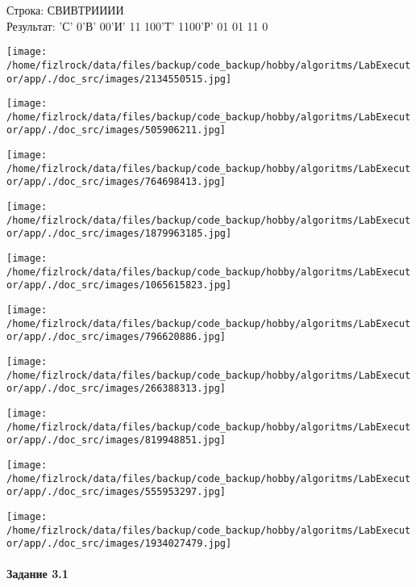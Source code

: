 \documentclass[a4paper, 12pt]{article}
\begin{document}
Строка: 
СВИВТРИИИИ\\
Результат: 'С' 0'В' 00'И' 11 100'Т' 1100'Р' 01 01 11 0

\texttt{[image: /home/fizlrock/data/files/backup/code\_backup/hobby/algoritms/LabExecutor/app/./doc\_src/images/2134550515.jpg]}

\texttt{[image: /home/fizlrock/data/files/backup/code\_backup/hobby/algoritms/LabExecutor/app/./doc\_src/images/505906211.jpg]}

\texttt{[image: /home/fizlrock/data/files/backup/code\_backup/hobby/algoritms/LabExecutor/app/./doc\_src/images/764698413.jpg]}

\texttt{[image: /home/fizlrock/data/files/backup/code\_backup/hobby/algoritms/LabExecutor/app/./doc\_src/images/1879963185.jpg]}

\texttt{[image: /home/fizlrock/data/files/backup/code\_backup/hobby/algoritms/LabExecutor/app/./doc\_src/images/1065615823.jpg]}

\texttt{[image: /home/fizlrock/data/files/backup/code\_backup/hobby/algoritms/LabExecutor/app/./doc\_src/images/796620886.jpg]}

\texttt{[image: /home/fizlrock/data/files/backup/code\_backup/hobby/algoritms/LabExecutor/app/./doc\_src/images/266388313.jpg]}

\texttt{[image: /home/fizlrock/data/files/backup/code\_backup/hobby/algoritms/LabExecutor/app/./doc\_src/images/819948851.jpg]}

\texttt{[image: /home/fizlrock/data/files/backup/code\_backup/hobby/algoritms/LabExecutor/app/./doc\_src/images/555953297.jpg]}

\texttt{[image: /home/fizlrock/data/files/backup/code\_backup/hobby/algoritms/LabExecutor/app/./doc\_src/images/1934027479.jpg]}
\pagebreak
\paragraph{Задание 3.1}
\end{document}

